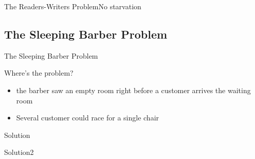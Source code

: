 \begin{frame}{The Readers-Writers Problem}{No starvation}
  \centering
\end{frame}

\subsection{The Sleeping Barber Problem}
\label{sec:sleep-barb-probl}

\begin{frame}{The Sleeping Barber Problem}
  \begin{minipage}[m]{.45\linewidth}
  \end{minipage}\quad
  \begin{minipage}[m]{.5\linewidth}
    \begin{iblock}{Where's the problem?}
      \begin{itemize}
      \item the barber saw an empty room right before a customer arrives the waiting room
      \item Several customer could race for a single chair
      \end{itemize}
    \end{iblock}
  \end{minipage}
\end{frame}

\begin{frame}{Solution}
  \centering
\end{frame}

\begin{frame}{Solution2}
  \centering
\end{frame}


